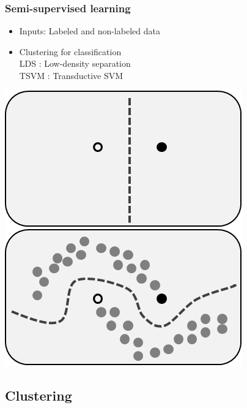 \documentclass{beamer}
\begin{document}
\begin{frame}
\frametitle{Semi-supervised learning}
\begin{minipage}{.55\linewidth}
\begin{itemize}
\item Inputs: Labeled and non-labeled data
\item Clustering for classification\\
LDS : Low-density separation\\
TSVM : Transductive SVM
\end{itemize}
\end{minipage}
\hfill
\begin{minipage}{.4\linewidth}
\centering
\includegraphics[scale=.37]{semisupervised.png}
\end{minipage}

\end{frame}

\subsection{Clustering}
\end{document}
